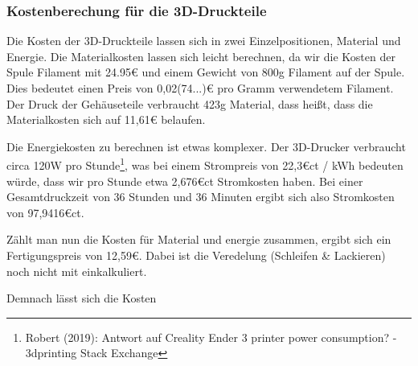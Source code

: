 \subsubsection{Kostenberechung für die 3D-Druckteile}
Die Kosten der 3D-Druckteile lassen sich in zwei Einzelpositionen, Material und Energie.
Die Materialkosten lassen sich leicht berechnen, da wir die Kosten der Spule Filament mit 24.95\euro{} und einem Gewicht von 800g Filament auf der Spule.
Dies bedeutet einen Preis von 0,02(74...)\euro{} pro Gramm verwendetem Filament.
Der Druck der Gehäuseteile verbraucht 423g Material, dass heißt, dass die Materialkosten sich auf 11,61\euro{} belaufen.\par
\noindent Die Energiekosten zu berechnen ist etwas komplexer.
Der 3D-Drucker verbraucht circa 120W pro Stunde\footnote{Robert (2019): Antwort auf Creality Ender 3 printer power consumption? - 3dprinting Stack Exchange}, was bei einem Strompreis von 22,3\euro{}ct / kWh bedeuten würde, dass wir pro Stunde etwa 2,676\euro{}ct Stromkosten haben. 
Bei einer Gesamtdruckzeit von 36 Stunden und 36 Minuten ergibt sich also Stromkosten von 97,9416\euro{}ct.\par
\noindent Zählt man nun die Kosten für Material und energie zusammen, ergibt sich ein Fertigungspreis von 12,59\euro{}. 
Dabei ist die Veredelung (Schleifen \& Lackieren) noch nicht mit einkalkuliert.\par
\noindent Demnach lässt sich die Kosten 